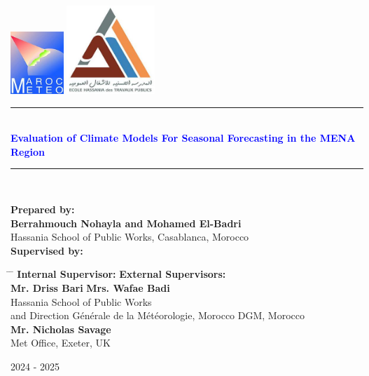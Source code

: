 \clearpage
\begin{titlepage}
  \begin{center}
    \includegraphics[width=0.15\textwidth]{DGM.jpg} \hfill
    \includegraphics[width=0.25\textwidth]{ehtp.jpg} \\[2cm]

    
    \noindent\rule{\textwidth}{1mm}\\[0.5cm]
    {\LARGE \textbf{\textcolor{blue}{Evaluation of Climate Models For Seasonal Forecasting in the MENA Region\\ \vspace{0.1cm} 
   }}}
    \noindent\rule{\textwidth}{1mm}\\[3cm]
    \vfill
 \begin{center}
    \textbf{\large Prepared by:} \\[0.2cm]
    \textbf{Berrahmouch Nohayla and Mohamed El-Badri} \\[0.2cm]
    Hassania School of Public Works, Casablanca, Morocco \\[1.5cm]
    
    \textbf{\large Supervised by:}
\end{center}

\begin{tabbing}
    \hspace{6cm} \= \hspace{6cm} \= \kill 
    \textbf{Internal Supervisor:} \> \> \textbf{External Supervisors:} \\[0.5cm]
    \textbf{Mr. Driss Bari} \> \> \textbf{Mrs. Wafae Badi} \\[0.2cm]
    Hassania School of Public Works \\ 
    and Direction Générale de la Météorologie, Morocco \> \> DGM, Morocco \\[0.5cm]
    
    \> \> \textbf{Mr. Nicholas Savage} \\[0.2cm]
    \> \> Met Office, Exeter, UK \\
\end{tabbing}


    \vfill

    {\large 2024 - 2025} \\[1cm]
  \end{center}
\end{titlepage}

